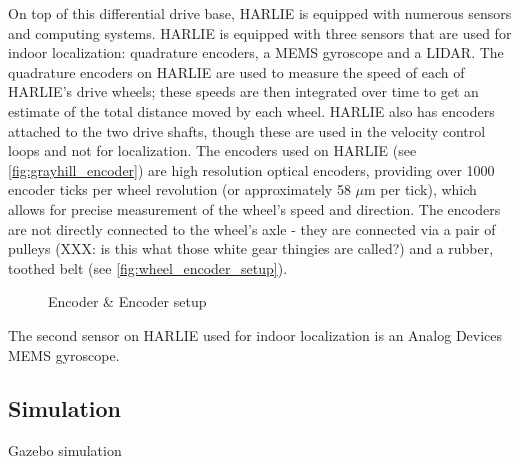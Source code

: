 On top of this differential drive base, HARLIE is equipped with numerous sensors and computing systems. HARLIE is equipped with three sensors that are used for indoor localization: quadrature encoders, a MEMS gyroscope and a LIDAR. The quadrature encoders on HARLIE are used to measure the speed of each of HARLIE's drive wheels; these speeds are then integrated over time to get an estimate of the total distance moved by each wheel. HARLIE also has encoders attached to the two drive shafts, though these are used in the velocity control loops and not for localization. The encoders used on HARLIE (see \autoref{fig:grayhill_encoder}) are high resolution optical encoders, providing over 1000 encoder ticks per wheel revolution (or approximately 58 $\mu$m per tick), which allows for precise measurement of the wheel's speed and direction. The encoders are not directly connected to the wheel's axle - they are connected via a pair of pulleys (XXX: is this what those white gear thingies are called?) and a rubber, toothed belt (see \autoref{fig:wheel_encoder_setup}).

\begin{figure}
\centering
{}
\caption{Encoder \& Encoder setup}
\label{fig:encoder_and_setup}
\end{figure}

The second sensor on HARLIE used for indoor localization is an Analog Devices MEMS gyroscope. 

\subsection{Simulation}\label{subsec:simulation_setup}

Gazebo simulation
